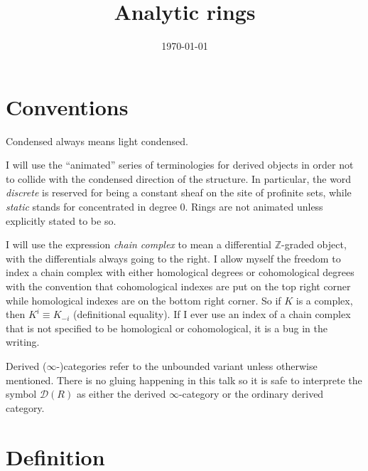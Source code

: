 \documentclass{article}
\title{Analytic rings}
\author{}
\date{\today}
\theoremstyle{plain}
\theoremstyle{definition}
\theoremstyle{remark}
\newcommand{\quot}[1]{“#1”}
\newcommand{\D}{\mathcal{D}}
\begin{document}
\maketitle
\tableofcontents

\section*{Conventions}

Condensed always means light condensed.

I will use the \quot{animated} series of terminologies for derived objects in order not to collide with the condensed direction of the structure.
In particular,
the word \emph{discrete} is reserved for being a constant sheaf on the site of profinite sets, while
\emph{static} stands for concentrated in degree $ 0 $.
Rings are not animated unless explicitly stated to be so.

I will use the expression \emph{chain complex} to mean a differential $ \mathbb{Z} $-graded object, with
the differentials always going to the right.
I allow myself the freedom to index a chain complex with either homological degrees or cohomological degrees with the convention that
cohomological indexes are put on the top right corner while homological indexes are on the bottom right corner.
So if $ K $ is a complex, then $ K ^{i} \equiv K _{-i} $ (definitional equality).
If I ever use an index of a chain complex that is not specified to be homological or cohomological, it is a bug in the writing.

Derived ($ \infty $-)categories refer to the unbounded variant unless otherwise mentioned.
There is no gluing happening in this talk so it is safe to interprete the symbol $ \D(R) $ as either the derived $ \infty $-category
or the ordinary derived category.

\pagebreak

\section{Definition}
\end{document}
